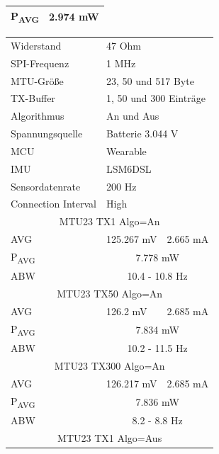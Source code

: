 \begin{figure}[!hbtp]
\begin{minipage}{0.5\textwidth}
\begin{tabular}{|l|l|l|}
      P\textsubscript{AVG} & \multicolumn{2}{c|}{2.974 mW}\\
      \hline
    \end{tabular}
    \label{tab:test1}
  \end{minipage}
  \begin{minipage}{0.5\textwidth}
    \centering
    \begin{tabular}{|l|l|l|}
      \hline
      Widerstand & \multicolumn{2}{l|}{47 Ohm}\\
      SPI-Frequenz & \multicolumn{2}{l|}{1 MHz}\\
      MTU-Größe & \multicolumn{2}{l|}{23, 50 und 517 Byte}\\
      TX-Buffer & \multicolumn{2}{l|}{1, 50 und 300 Einträge}\\
      Algorithmus & \multicolumn{2}{l|}{An und Aus}\\
      Spannungsquelle & \multicolumn{2}{l|}{Batterie 3.044 V}\\
      MCU & \multicolumn{2}{l|}{Wearable}\\
      IMU & \multicolumn{2}{l|}{LSM6DSL}\\
      Sensordatenrate & \multicolumn{2}{l|}{200 Hz}\\
      Connection Interval & \multicolumn{2}{l|}{High}\\
      \hline
      \multicolumn{3}{|c|}{MTU23 TX1 Algo=An}\\
      AVG & 125.267 mV & 2.665 mA\\
      P\textsubscript{AVG} & \multicolumn{2}{c|}{7.778 mW}\\
      ABW & \multicolumn{2}{c|}{10.4 - 10.8 Hz}\\
      \hline
      \multicolumn{3}{|c|}{MTU23 TX50 Algo=An}\\
      AVG & 126.2 mV & 2.685 mA\\
      P\textsubscript{AVG} & \multicolumn{2}{c|}{7.834 mW}\\
      ABW & \multicolumn{2}{c|}{10.2 - 11.5 Hz}\\
      \hline
      \multicolumn{3}{|c|}{MTU23 TX300 Algo=An}\\
      AVG & 126.217 mV & 2.685 mA\\
      P\textsubscript{AVG} & \multicolumn{2}{c|}{7.836 mW}\\
      ABW & \multicolumn{2}{c|}{8.2 - 8.8 Hz}\\
      \hline
      \multicolumn{3}{|c|}{MTU23 TX1 Algo=Aus}\\

\end{tabular}
\end{minipage}
\end{figure}
